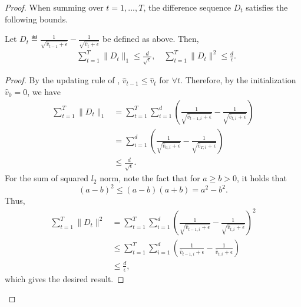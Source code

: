 \documentclass[11pt]{article}
\begin{document}
\begin{proof}
When summing over $t=1,...,T$, the difference sequence $D_t$ satisfies the following bounds.

\begin{Lemma}  \label{lemma:bound difference}
Let $D_t\eqdef \frac{1}{\sqrt{\hat v_{t-1}+\epsilon}}-\frac{1}{\sqrt{\hat v_t+\epsilon}}$ be defined as above. Then,
\begin{align*}
    &\sum_{t=1}^T \|D_t\|_1 \leq \frac{d}{\sqrt\epsilon},\quad  \sum_{t=1}^T \|D_t\|^2 \leq \frac{d}{\epsilon}.
\end{align*}
\end{Lemma}

\begin{proof}
By the updating rule of \algo, $\hat v_{t-1}\leq \hat v_t$ for $\forall t$. Therefore, by the initialization $\hat v_0=0$, we have
\begin{align*}
    \sum_{t=1}^T \|D_t\|_1 &=\sum_{t=1}^T \sum_{i=1}^d (\frac{1}{\sqrt{\hat v_{t-1,i}+\epsilon}}-\frac{1}{\sqrt{\hat v_{t,i}+\epsilon}})\\
    &=\sum_{i=1}^d (\frac{1}{\sqrt{\hat v_{0,i}+\epsilon}}-\frac{1}{\sqrt{\hat v_{T,i}+\epsilon}})\\
    &\leq \frac{d}{\sqrt\epsilon}.
\end{align*}
For the sum of squared $l_2$ norm, note the fact that for $a\geq b>0$, it holds that
\begin{equation*}
    (a-b)^2\leq (a-b)(a+b)=a^2-b^2.
\end{equation*}
Thus,
\begin{align*}
    \sum_{t=1}^T \|D_t\|^2&=\sum_{t=1}^T \sum_{i=1}^d (\frac{1}{\sqrt{\hat v_{t-1,i}+\epsilon}}-\frac{1}{\sqrt{\hat v_{t,i}+\epsilon}})^2\\
    &\leq \sum_{t=1}^T \sum_{i=1}^d (\frac{1}{\hat v_{t-1,i}+\epsilon}-\frac{1}{\hat v_{t,i}+\epsilon})\\
    &\leq \frac{d}{\epsilon},
\end{align*}
which gives the desired result.
\end{proof}



\end{proof}
\end{document}
